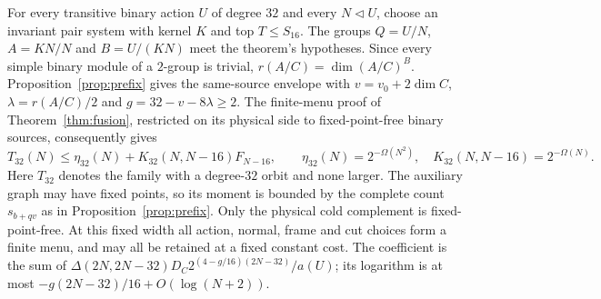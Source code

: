 For every transitive binary action $U$ of degree $32$ and every
$N\lhd U$, choose an invariant pair system with kernel $K$ and top
$T\leq S_{16}$. The groups
$Q=U/N$, $A=KN/N$ and $B=U/(KN)$ meet the theorem's hypotheses.
Since every simple binary module of a $2$-group is trivial,
$r(A/C)=\dim(A/C)^B$. Proposition~\ref{prop:prefix} gives the
same-source envelope with $v=v_0+2\dim C$, $\lambda=r(A/C)/2$ and
$g=32-v-8\lambda\geq2$.
The finite-menu proof of Theorem~\ref{thm:fusion}, restricted on its
physical side to fixed-point-free binary sources, consequently gives
\begin{equation}\label{eq:binary32-fusion}
 T_{32}(N)\leq\eta_{32}(N)+K_{32}(N,N-16)F_{N-16},\qquad
 \eta_{32}(N)=2^{-\Omega(N^2)},\quad
 K_{32}(N,N-16)=2^{-\Omega(N)}.
\end{equation}
Here $T_{32}$ denotes the family with a degree-$32$ orbit and none
larger. The auxiliary graph may have fixed points, so its moment is
bounded by the complete count $s_{b+qv}$ as in
Proposition~\ref{prop:prefix}. Only the physical cold complement is
fixed-point-free. At this fixed width all action, normal, frame and
cut choices form a finite menu, and may all be retained at a fixed
constant cost. The coefficient is the sum of
$\Delta(2N,2N-32)D_C2^{(4-g/16)(2N-32)}/a(U)$;
its logarithm is at most $-g(2N-32)/16+O(\log(N+2))$.

